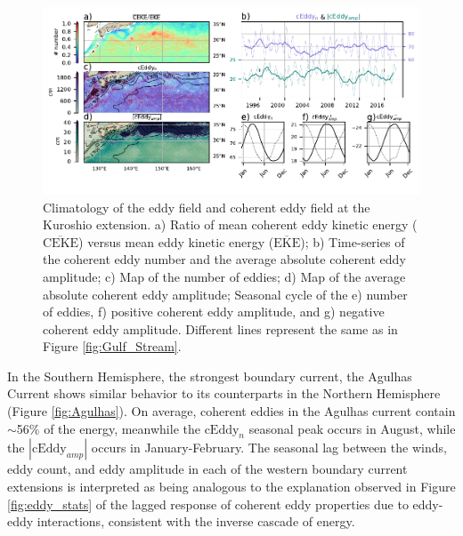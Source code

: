\documentclass[draft,linenumbers]{agujournal2019}
\newcommand{\MEKE}{\overline{\textrm{EKE}}}
\newcommand{\MCEKE}{\overline{\textrm{CEKE}}}
\newcommand{\cEddy}{\textrm{cEddy}}
\begin{document}
	\begin{figure}
	    \centering
	    \includegraphics[width=1\textwidth]{figures/regional_ratios_and_stats_V3_4.pdf}
	    \caption{Climatology of the eddy field and coherent eddy field at the Kuroshio extension. a) Ratio of mean coherent eddy kinetic energy ($\MCEKE$) versus mean eddy kinetic energy ($\MEKE$); b) Time-series of the coherent eddy number and the average absolute coherent eddy amplitude; c) Map of the number of eddies; d) Map of the average absolute coherent eddy amplitude; Seasonal cycle of the e) number of eddies, f) positive coherent eddy amplitude, and g) negative coherent eddy amplitude. Different lines represent the same as in Figure \ref{fig:Gulf_Stream}.}
	    \label{fig:Kuroshio}
	\end{figure}

	In the Southern Hemisphere, the strongest boundary current, the Agulhas Current shows similar behavior to its counterparts in the Northern Hemisphere (Figure \ref{fig:Agulhas}). On average, coherent eddies in the Agulhas current contain $\sim$56\% of the energy, meanwhile the $\cEddy_{n}$ seasonal peak occurs in August, while the $|\cEddy_{amp}|$ occurs in January-February. 
	The seasonal lag between the winds, eddy count, and eddy amplitude in each of the western boundary current extensions is interpreted as being analogous to the explanation observed in Figure \ref{fig:eddy_stats} of the lagged response of coherent eddy properties due to eddy-eddy interactions, consistent with the inverse cascade of energy.
\end{document}

